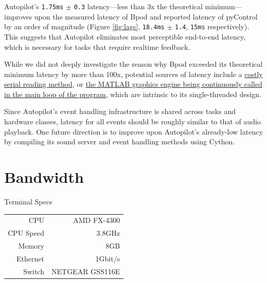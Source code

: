 \clearpage

Autopilot's  \texttt{1.75ms} $\pm$ \texttt{0.3} latency---less than 3x the theoretical minimum---improves upon the measured latency of Bpod and reported latency of pyControl by an order of magnitude (Figure \ref{fig:lags}, \texttt{18.4ms} $\pm$ \texttt{1.4}, \texttt{15ms} respectively). This suggests that Autopilot eliminates most perceptible end-to-end latency, which is necessary for tasks that require realtime feedback.

While we did not deeply investigate the reason why Bpod exceeded its theoretical minimum latency by more than 100x, potential sources of latency include a \href{https://github.com/sanworks/Bpod_Gen2/blob/825eaf6ea2cb11da956ee21c42876c4363e9c14e/Functions/Internal\%20Functions/ArCOM/ArCOMObject_Bpod.m#L304}{costly serial reading method}, or \href{https://github.com/sanworks/Bpod/blob/4b756d8251f0a06ee9a442e9cac465872c1b4174/Functions/RunStateMatrix.m#L189}{the MATLAB graphics engine being continuously called in the main loop of the program}, which are intrinsic to its single-threaded design.

Since Autopilot's event handling infrastructure is shared across tasks and hardware classes, latency for all events should be roughly similar to that of audio playback. One future direction is to improve upon Autopilot's already-low latency by compiling its sound server and event handling methods using Cython.

\section{Bandwidth}

\begin{margintable}[-6.6cm]
\caption{Terminal Specs}
\label{tab:terminal}
\noindent\begin{tabularx}{\linewidth}{rR}
\toprule
    CPU & AMD FX-4300 \\
    CPU Speed & 3.8GHz \\
    Memory & 8GB \\
    Ethernet & 1Gbit/s \\
    Switch & NETGEAR GSS116E \\
\bottomrule
\end{tabularx}
\end{margintable}

